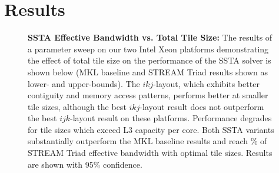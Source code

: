 \documentclass[10pt, conference, compsocconf]{IEEEtran}
\newcommand{\textapprox}{\texttildelow}
\begin{document}
\section{Results}
\label{sec:results}

\begin{figure}[!bth]
  \centering
  \caption{\small
    \textbf{SSTA Effective Bandwidth vs. Total Tile Size:}
    The results of a parameter sweep on our two Intel Xeon platforms
      demonstrating the effect of total tile size on the performance of the
      SSTA solver is shown below (MKL baseline and STREAM Triad results shown as
      lower- and upper-bounds).
    The \(ikj\)-layout, which exhibits better contiguity and memory access
      patterns, performs better at smaller tile sizes, although the best
      \(ikj\)-layout result does not outperform the best \(ijk\)-layout result
      on these platforms.
    Performance degrades for tile sizes which exceed L3 capacity per core.
    Both SSTA variants substantially outperform the MKL baseline results and 
      reach \textapprox 90\% of STREAM Triad effective bandwidth with optimal 
      tile sizes.
    Results are shown with 95\% confidence.
  }
  \label{fig:results:bw_vs_tile_size_xeon}
  \begin{minipage}{0.49\textwidth}
  \end{minipage}
  \begin{minipage}{0.49\textwidth}
  \end{minipage}
  \vspace{-8mm}
\end{figure}
\end{document}
